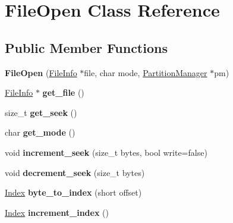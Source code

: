 \hypertarget{classFileOpen}{}\section{File\+Open Class Reference}
\label{classFileOpen}
\subsection*{Public Member Functions}
\begin{DoxyCompactItemize}
\item 
{\bfseries File\+Open} (\hyperlink{classFileInfo}{File\+Info} $\ast$file, char mode, \hyperlink{classPartitionManager}{Partition\+Manager} $\ast$pm)\hypertarget{classFileOpen_a387c8980a812856a3633ff162c1c1af4}{}\label{classFileOpen_a387c8980a812856a3633ff162c1c1af4}

\item 
\hyperlink{classFileInfo}{File\+Info} $\ast$ {\bfseries get\+\_\+file} ()\hypertarget{classFileOpen_ad1451c997a9300d20ba8e1af28fda08c}{}\label{classFileOpen_ad1451c997a9300d20ba8e1af28fda08c}

\item 
size\+\_\+t {\bfseries get\+\_\+seek} ()\hypertarget{classFileOpen_a8acd2b1d7f9cb2fe6030a75538ce62bb}{}\label{classFileOpen_a8acd2b1d7f9cb2fe6030a75538ce62bb}

\item 
char {\bfseries get\+\_\+mode} ()\hypertarget{classFileOpen_a716c5d9b534be9cac550f3e64620514a}{}\label{classFileOpen_a716c5d9b534be9cac550f3e64620514a}

\item 
void {\bfseries increment\+\_\+seek} (size\+\_\+t bytes, bool write=false)\hypertarget{classFileOpen_a8b178b10d2081d8c64a1218f11b9265a}{}\label{classFileOpen_a8b178b10d2081d8c64a1218f11b9265a}

\item 
void {\bfseries decrement\+\_\+seek} (size\+\_\+t bytes)\hypertarget{classFileOpen_a7e1fd46a093bef3a650e1d1e4d431cf7}{}\label{classFileOpen_a7e1fd46a093bef3a650e1d1e4d431cf7}

\item 
\hyperlink{structindex}{Index} {\bfseries byte\+\_\+to\+\_\+index} (short offset)\hypertarget{classFileOpen_a6d1374e052e3d9ba190e2797d9ae06a0}{}\label{classFileOpen_a6d1374e052e3d9ba190e2797d9ae06a0}

\item 
\hyperlink{structindex}{Index} {\bfseries increment\+\_\+index} ()\hypertarget{classFileOpen_abd29158f55f135ada0c5a0f25ee5ace6}{}\label{classFileOpen_abd29158f55f135ada0c5a0f25ee5ace6}


\end{DoxyCompactItemize}
